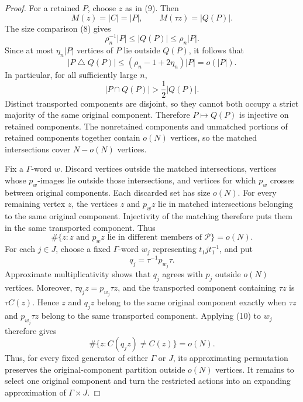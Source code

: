 \documentclass[10pt]{article}
\newcommand{\abs}[1]{\left|#1\right|}
\begin{document}
\begin{proof}
For a retained $P$, choose $z$ as in (9). Then
\[
M(z)=\abs{C}=\abs{P},\qquad M(\tau z)=\abs{Q(P)}.
\]
The size comparison (8) gives
\[
\rho_n^{-1}\abs{P}\leq\abs{Q(P)}\leq\rho_n\abs{P}.
\]
Since at most $\eta_n\abs{P}$ vertices of $P$ lie outside $Q(P)$, it follows that
\[
\abs{P\mathbin{\triangle}Q(P)}\leq(\rho_n-1+2\eta_n)\abs{P}=o(\abs{P}).
\]
In particular, for all sufficiently large $n$,
\[
\abs{P\cap Q(P)}>\frac12\abs{Q(P)}.
\]
Distinct transported components are disjoint, so they cannot both occupy a strict majority of the same original component. Therefore $P\mapsto Q(P)$ is injective on retained components. The nonretained components and unmatched portions of retained components together contain $o(N)$ vertices, so the matched intersections cover $N-o(N)$ vertices.

Fix a $\Gamma$-word $w$. Discard vertices outside the matched intersections, vertices whose $p_w$-images lie outside those intersections, and vertices for which $p_w$ crosses between original components. Each discarded set has size $o(N)$. For every remaining vertex $z$, the vertices $z$ and $p_wz$ lie in matched intersections belonging to the same original component. Injectivity of the matching therefore puts them in the same transported component. Thus
\begin{equation}
\#\{z:z\text{ and }p_wz\text{ lie in different members of }\mathcal P\}=o(N).
\tag{10}
\end{equation}
For each $j\in J$, choose a fixed $\Gamma$-word $w_j$ representing $t_1jt_1^{-1}$, and put
\[
q_j=\tau^{-1}p_{w_j}\tau.
\]
Approximate multiplicativity shows that $q_j$ agrees with $p_j$ outside $o(N)$ vertices. Moreover, $\tau q_jz=p_{w_j}\tau z$, and the transported component containing $\tau z$ is $\tau C(z)$. Hence $z$ and $q_jz$ belong to the same original component exactly when $\tau z$ and $p_{w_j}\tau z$ belong to the same transported component. Applying (10) to $w_j$ therefore gives
\begin{equation}
\#\{z:C(q_jz)\neq C(z)\}=o(N).
\tag{11}
\end{equation}
Thus, for every fixed generator of either $\Gamma$ or $J$, its approximating permutation preserves the original-component partition outside $o(N)$ vertices. It remains to select one original component and turn the restricted actions into an expanding approximation of $\Gamma\times J$.


\end{proof}
\end{document}
